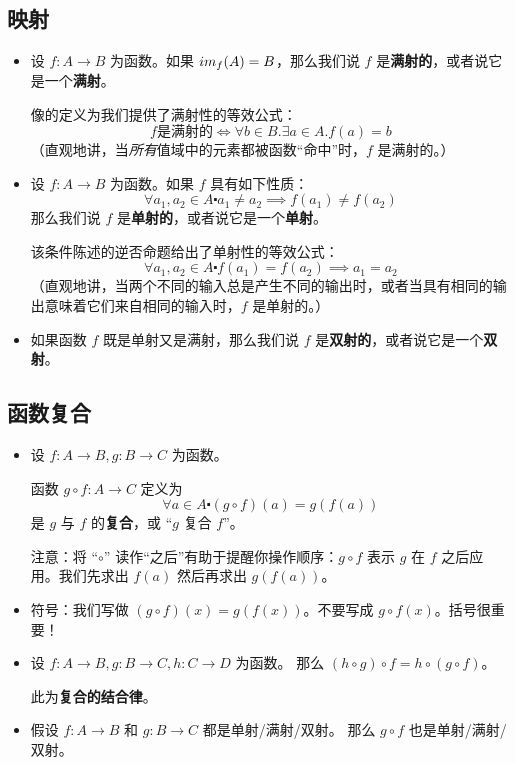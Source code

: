 \subsection{映射}

\begin{itemize}
    \item 设 $f : A \to B$ 为函数。如果 $\\im_f (A) = B$，那么我们说 $f$ 是\textbf{满射的}，或者说它是一个\textbf{满射}。

          像的定义为我们提供了满射性的等效公式：
          \[f \text{是满射的} \iff \forall b \in B. \exists a \in A. f(a) = b\]
          （直观地讲，当\emph{所有}值域中的元素都被函数``命中''时，$f$ 是满射的。）
    \item 设 $f : A \to B$ 为函数。如果 $f$ 具有如下性质：
          \[\forall a_1, a_2 \in A \centerdot a_1 \ne a_2 \implies f(a_1) \ne f(a_2)\]
          那么我们说 $f$ 是\textbf{单射的}，或者说它是一个\textbf{单射}。

          该条件陈述的逆否命题给出了单射性的等效公式：
          \[\forall a_1, a_2 \in A \centerdot f(a_1) = f(a_2) \implies a_1 = a_2\]
          （直观地讲，当两个不同的输入总是产生不同的输出时，或者当具有相同的输出意味着它们来自相同的输入时，$f$ 是单射的。）
    \item 如果函数 $f$ 既是单射又是满射，那么我们说 $f$ 是\textbf{双射的}，或者说它是一个\textbf{双射}。
\end{itemize}

\subsection{函数复合}

\begin{itemize}
    \item 设 $f: A \to B , g: B \to C$ 为函数。

          函数 $g \circ f : A \to C$ 定义为
          \[\forall a \in A \centerdot (g \circ f)(a) = g(f(a))\]
          是 $g$ 与 $f$ 的\textbf{复合}，或 ``$g$ 复合 $f$''。

          注意：将 ``$\circ$'' 读作``之后''有助于提醒你操作顺序：$g \circ f$ 表示 $g$ 在 $f$ 之后应用。我们先求出 $f(a)$ 然后再求出 $g(f(a))$。
    \item 符号：我们写做 $(g \circ f)(x) = g(f(x))$。不要写成 $g \circ f(x)$。括号很重要！
    \item 设 $f : A \to B , g : B \to C , h : C \to D$ 为函数。 那么 $(h \circ g) \circ f = h \circ (g \circ f)$。

          此为\textbf{复合的结合律}。
    \item 假设 $f : A \to B$ 和 $g : B \to C$ 都是单射/满射/双射。 那么 $g \circ f$ 也是单射/满射/双射。

\end{itemize}

